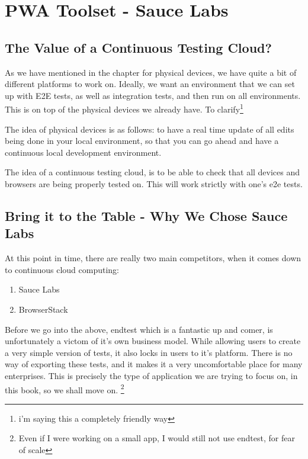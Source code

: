 
\chapter{ PWA Toolset - Sauce Labs }

\section{ The Value of a Continuous Testing Cloud? }

As we have mentioned in the chapter for physical devices, we have quite a bit of
different platforms to work on. Ideally, we want an environment that we can set
up with E2E tests, as well as integration tests, and then run on all environments.
This is on top of the physical devices we already have. To clarify\footnote{i'm saying this a completely friendly way}

The idea of physical devices is as follows: to have a real time update of all
edits being done in your local environment, so that you can go ahead and have a
continuous local development environment.

The idea of a continuous testing cloud, is to be able to check that all devices
and browsers are being properly tested on. This will work strictly with one's
e2e tests.

\section{ Bring it to the Table - Why We Chose Sauce Labs }

At this point in time, there are really two main competitors, when it comes
down to continuous cloud computing:

\begin{enumerate}
  \item Sauce Labs
  \item BrowserStack
\end{enumerate}

Before we go into the above, endtest which is a fantastic up and comer, is
unfortunately a victom of it's own business model. While allowing users to
create a very simple version of tests, it also locks in users to it's platform.
There is no way of exporting these tests, and it makes it a very uncomfortable
place for many enterprises. This is precisely the type of application we are
trying to focus on, in this book, so we shall move on. \footnote{Even if I were
working on a small app, I would still not use endtest, for fear of scale}

